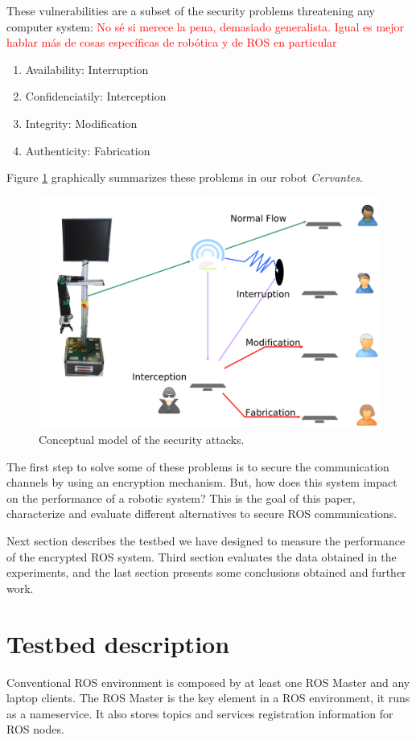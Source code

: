\documentclass[journal,twoside]{JoPhA}
\begin{document}
These vulnerabilities are a subset of the security problems threatening any computer system:
{\textcolor{red}{No s\'e si merece la pena, demasiado generalista. Igual es mejor hablar más de cosas específicas de robótica y de ROS en particular}}
\begin{enumerate}
 \item Availability: Interruption
 \item Confidenciatily: Interception
 \item Integrity: Modification
 \item Authenticity: Fabrication
\end{enumerate}

Figure \ref{fig:Conceptualmodel} graphically summarizes these problems in our robot \textit{Cervantes}.

\begin{figure}[ht]
    \centering
    \includegraphics[width=.5\textwidth]{SecurityAttacks.pdf}
    \caption{Conceptual model of the security attacks.}
  \label{fig:Conceptualmodel}
\end{figure}

The first step to solve some of these problems is to secure the communication channels by using an encryption mechanism. But, how does this system impact on the performance of a robotic system? This is the goal of this paper, characterize and evaluate different alternatives to secure ROS communications.

Next section describes the testbed we have designed to measure the performance of the encrypted ROS system. Third section evaluates the data obtained in the experiments, and the last section presents some conclusions obtained and further work.



\section{Testbed description}

Conventional ROS environment is composed by at least one ROS Master and any laptop clients. The ROS Master is the key element in a ROS environment, it runs as a nameservice.
It also stores topics and services registration information for ROS nodes. 
\end{document}
